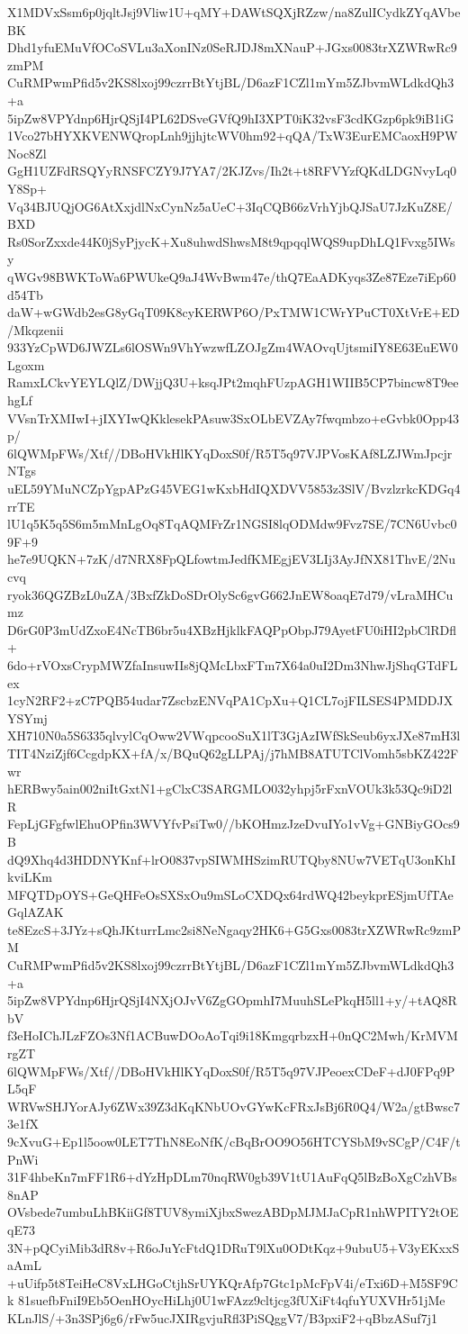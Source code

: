 X1MDVxSsm6p0jqltJsj9Vliw1U+qMY+DAWtSQXjRZzw/na8ZulICydkZYqAVbeBK
Dhd1yfuEMuVfOCoSVLu3aXonINz0SeRJDJ8mXNauP+JGxs0083trXZWRwRc9zmPM
CuRMPwmPfid5v2KS8lxoj99czrrBtYtjBL/D6azF1CZl1mYm5ZJbvmWLdkdQh3+a
5ipZw8VPYdnp6HjrQSjI4PL62DSveGVfQ9hI3XPT0iK32vsF3cdKGzp6pk9iB1iG
1Vco27bHYXKVENWQropLnh9jjhjtcWV0hm92+qQA/TxW3EurEMCaoxH9PWNoc8Zl
GgH1UZFdRSQYyRNSFCZY9J7YA7/2KJZvs/Ih2t+t8RFVYzfQKdLDGNvyLq0Y8Sp+
Vq34BJUQjOG6AtXxjdlNxCynNz5aUeC+3IqCQB66zVrhYjbQJSaU7JzKuZ8E/BXD
Rs0SorZxxde44K0jSyPjycK+Xu8uhwdShwsM8t9qpqqlWQS9upDhLQ1Fvxg5IWsy
qWGv98BWKToWa6PWUkeQ9aJ4WvBwm47e/thQ7EaADKyqs3Ze87Eze7iEp60d54Tb
daW+wGWdb2esG8yGqT09K8cyKERWP6O/PxTMW1CWrYPuCT0XtVrE+ED/Mkqzenii
933YzCpWD6JWZLs6lOSWn9VhYwzwfLZOJgZm4WAOvqUjtsmiIY8E63EuEW0Lgoxm
RamxLCkvYEYLQlZ/DWjjQ3U+ksqJPt2mqhFUzpAGH1WIIB5CP7bincw8T9eehgLf
VVsnTrXMIwI+jIXYIwQKklesekPAsuw3SxOLbEVZAy7fwqmbzo+eGvbk0Opp43p/
6lQWMpFWs/Xtf//DBoHVkHlKYqDoxS0f/R5T5q97VJPVosKAf8LZJWmJpcjrNTgs
uEL59YMuNCZpYgpAPzG45VEG1wKxbHdIQXDVV5853z3SlV/BvzlzrkcKDGq4rrTE
lU1q5K5q5S6m5mMnLgOq8TqAQMFrZr1NGSI8lqODMdw9Fvz7SE/7CN6Uvbc09F+9
he7e9UQKN+7zK/d7NRX8FpQLfowtmJedfKMEgjEV3LIj3AyJfNX81ThvE/2Nucvq
ryok36QGZBzL0uZA/3BxfZkDoSDrOlySc6gvG662JnEW8oaqE7d79/vLraMHCumz
D6rG0P3mUdZxoE4NcTB6br5u4XBzHjklkFAQPpObpJ79AyetFU0iHI2pbClRDfl+
6do+rVOxsCrypMWZfaInsuwIIs8jQMcLbxFTm7X64a0uI2Dm3NhwJjShqGTdFLex
1cyN2RF2+zC7PQB54udar7ZscbzENVqPA1CpXu+Q1CL7ojFILSES4PMDDJXYSYmj
XH710N0a5S6335qlvylCqOww2VWqpcooSuX1lT3GjAzIWfSkSeub6yxJXe87mH3l
TIT4NziZjf6CcgdpKX+fA/x/BQuQ62gLLPAj/j7hMB8ATUTClVomh5sbKZ422Fwr
hERBwy5ain002niItGxtN1+gClxC3SARGMLO032yhpj5rFxnVOUk3k53Qc9iD2lR
FepLjGFgfwlEhuOPfin3WVYfvPsiTw0//bKOHmzJzeDvuIYo1vVg+GNBiyGOcs9B
dQ9Xhq4d3HDDNYKnf+lrO0837vpSIWMHSzimRUTQby8NUw7VETqU3onKhIkviLKm
MFQTDpOYS+GeQHFeOsSXSxOu9mSLoCXDQx64rdWQ42beykprESjmUfTAeGqlAZAK
te8EzcS+3JYz+sQhJKturrLmc2si8NeNgaqy2HK6+G5Gxs0083trXZWRwRc9zmPM
CuRMPwmPfid5v2KS8lxoj99czrrBtYtjBL/D6azF1CZl1mYm5ZJbvmWLdkdQh3+a
5ipZw8VPYdnp6HjrQSjI4NXjOJvV6ZgGOpmhI7MuuhSLePkqH5ll1+y/+tAQ8RbV
f3eHoIChJLzFZOs3Nf1ACBuwDOoAoTqi9i18KmgqrbzxH+0nQC2Mwh/KrMVMrgZT
6lQWMpFWs/Xtf//DBoHVkHlKYqDoxS0f/R5T5q97VJPeoexCDeF+dJ0FPq9PL5qF
WRVwSHJYorAJy6ZWx39Z3dKqKNbUOvGYwKcFRxJsBj6R0Q4/W2a/gtBwsc73e1fX
9cXvuG+Ep1l5oow0LET7ThN8EoNfK/cBqBrOO9O56HTCYSbM9vSCgP/C4F/tPnWi
31F4hbeKn7mFF1R6+dYzHpDLm70nqRW0gb39V1tU1AuFqQ5lBzBoXgCzhVBs8nAP
OVsbede7umbuLhBKiiGf8TUV8ymiXjbxSwezABDpMJMJaCpR1nhWPITY2tOEqE73
3N+pQCyiMib3dR8v+R6oJuYcFtdQ1DRuT9lXu0ODtKqz+9ubuU5+V3yEKxxSaAmL
+uUifp5t8TeiHeC8VxLHGoCtjhSrUYKQrAfp7Gtc1pMcFpV4i/eTxi6D+M5SF9Ck
81suefbFniI9Eb5OenHOycHiLhj0U1wFAzz9cltjcg3fUXiFt4qfuYUXVHr51jMe
KLnJlS/+3n3SPj6g6/rFw5ucJXIRgvjuRfl3PiSQggV7/B3pxiF2+qBbzASuf7j1
